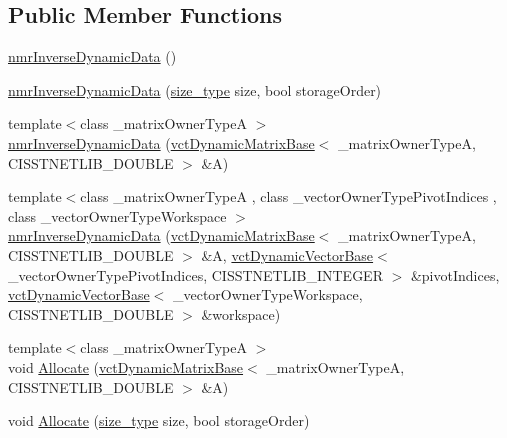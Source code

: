 \subsection*{Public Member Functions}
\begin{DoxyCompactItemize}
\item 
\hyperlink{classnmr_inverse_dynamic_data_a6f3268822254ce8a93f001c4db50ca1c}{nmr\-Inverse\-Dynamic\-Data} ()
\item 
\hyperlink{classnmr_inverse_dynamic_data_a45dde6cb419f11c6c5cec71d38f0c08d}{nmr\-Inverse\-Dynamic\-Data} (\hyperlink{classnmr_inverse_dynamic_data_aeb5c2317adf50d8fc7952a9b38bf0129}{size\-\_\-type} size, bool storage\-Order)
\item 
{\footnotesize template$<$class \-\_\-matrix\-Owner\-Type\-A $>$ }\\\hyperlink{classnmr_inverse_dynamic_data_a0ba22ece629f3a025f4dfd721dfa54f0}{nmr\-Inverse\-Dynamic\-Data} (\hyperlink{classvct_dynamic_matrix_base}{vct\-Dynamic\-Matrix\-Base}$<$ \-\_\-matrix\-Owner\-Type\-A, C\-I\-S\-S\-T\-N\-E\-T\-L\-I\-B\-\_\-\-D\-O\-U\-B\-L\-E $>$ \&A)
\item 
{\footnotesize template$<$class \-\_\-matrix\-Owner\-Type\-A , class \-\_\-vector\-Owner\-Type\-Pivot\-Indices , class \-\_\-vector\-Owner\-Type\-Workspace $>$ }\\\hyperlink{classnmr_inverse_dynamic_data_a6c0cdafd73bb3bad4b7f6113577044c4}{nmr\-Inverse\-Dynamic\-Data} (\hyperlink{classvct_dynamic_matrix_base}{vct\-Dynamic\-Matrix\-Base}$<$ \-\_\-matrix\-Owner\-Type\-A, C\-I\-S\-S\-T\-N\-E\-T\-L\-I\-B\-\_\-\-D\-O\-U\-B\-L\-E $>$ \&A, \hyperlink{classvct_dynamic_vector_base}{vct\-Dynamic\-Vector\-Base}$<$ \-\_\-vector\-Owner\-Type\-Pivot\-Indices, C\-I\-S\-S\-T\-N\-E\-T\-L\-I\-B\-\_\-\-I\-N\-T\-E\-G\-E\-R $>$ \&pivot\-Indices, \hyperlink{classvct_dynamic_vector_base}{vct\-Dynamic\-Vector\-Base}$<$ \-\_\-vector\-Owner\-Type\-Workspace, C\-I\-S\-S\-T\-N\-E\-T\-L\-I\-B\-\_\-\-D\-O\-U\-B\-L\-E $>$ \&workspace)
\item 
{\footnotesize template$<$class \-\_\-matrix\-Owner\-Type\-A $>$ }\\void \hyperlink{classnmr_inverse_dynamic_data_af35278f260546fa717a23a0950e6a4d9}{Allocate} (\hyperlink{classvct_dynamic_matrix_base}{vct\-Dynamic\-Matrix\-Base}$<$ \-\_\-matrix\-Owner\-Type\-A, C\-I\-S\-S\-T\-N\-E\-T\-L\-I\-B\-\_\-\-D\-O\-U\-B\-L\-E $>$ \&A)
\item 
void \hyperlink{classnmr_inverse_dynamic_data_a27ddc2327775aeb06396961e06c92f7d}{Allocate} (\hyperlink{classnmr_inverse_dynamic_data_aeb5c2317adf50d8fc7952a9b38bf0129}{size\-\_\-type} size, bool storage\-Order)

\end{DoxyCompactItemize}
